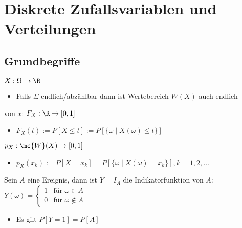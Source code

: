 
\section{Diskrete Zufallsvariablen und Verteilungen}
\subsection{Grundbegriffe}
\begin{itemize}
     $X: \Omega \to \R$
        \begin{itemize}
            \item Falls $\Sigma$ endlich/abzählbar dann ist Wertebereich $W(X)$ auch endlich
        \end{itemize}
     von $x$: $F_X : \R \to [0,1]$
        \begin{itemize}
            \item $F_X(t) := P[X \le t] := P[\{\omega \mid X(\omega) \le t\}]$
        \end{itemize}
     $p_X: \mc{W}(X) \to [0,1]$
        \begin{itemize}
            \item $p_X(x_k) := P[X = x_k] = P[\{\omega \mid X(\omega) = x_k\}], k = 1, 2, \dots$
        \end{itemize}
         Sein $A$ eine Ereignis, dann ist $Y = I_A$ die Indikatorfunktion von $A$: $Y(\omega)=
\begin{cases}
    1 & \text{für } \omega \in A\\
    0 & \text{für } \omega \notin A
\end{cases}$
            \begin{itemize}
                \item Es gilt $P[Y = 1] = P[A]$
            \end{itemize}
\end{itemize}

